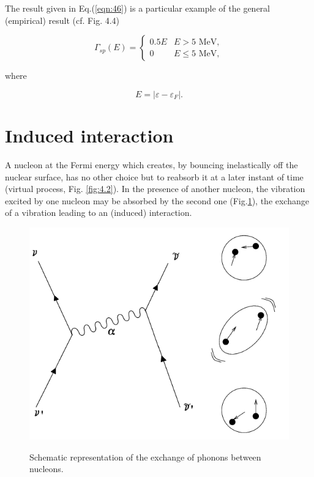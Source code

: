 \documentclass[a4paper,14pt]{book}
\begin{document}
The result given in Eq.(\ref{eqn:46}) is a particular example of the general (empirical) result (cf. Fig. 4.4)

\begin{equation}
\Gamma_{sp} (E) =
  \begin{cases}
    0.5 E & \text{$E>5$ MeV}, \\
    0     & \text{$E \leq 5$ MeV},
  \end{cases}
\label{eqn:47}
\end{equation}

\noindent where

\begin{equation}
E = |\varepsilon - \varepsilon_F| .
\label{eqn:48}
\end{equation}


\section{Induced interaction}

A nucleon at the Fermi energy which creates, by bouncing inelastically off the nuclear surface, has no other choice but to reabsorb it at a later instant of time (virtual process, Fig. \ref{fig:4.2}). In the presence of another nucleon, the vibration excited by one nucleon may be absorbed by the second one (Fig.\ref{fig:4.9}), the exchange of a vibration leading to an (induced) interaction.

\begin{figure}[h!]
\centerline {
{\includegraphics*[width=\textwidth]{figs_C4S/fig_4_9}}
}
\caption{Schematic representation of the exchange of phonons between nucleons.}
\label{fig:4.9}
\end{figure}
\end{document}
